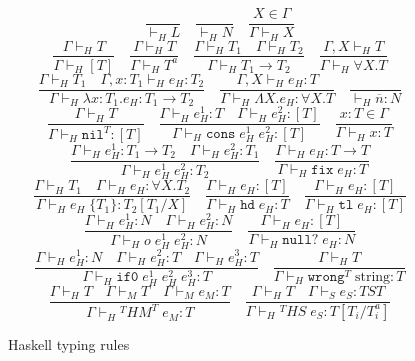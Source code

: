 \begin{figure}[p]
\[
\frac{}{\vdash_{H}L}
\quad
\frac{}{\vdash_{H}N}
\quad
\frac{X\in\Gamma}{\Gamma\vdash_{H}X}
\]
\[
\frac{\Gamma\vdash_{H}T}{\Gamma\vdash_{H}[T]}
\quad
\frac{\Gamma\vdash_{H}T}{\Gamma\vdash_{H}T^{a}}
\quad
\frac{\Gamma\vdash_{H}T_{1}\quad\Gamma\vdash_{H}T_{2}}{\Gamma\vdash_{H}T_{1}\rightarrow T_{2}}
\quad
\frac{\Gamma ,X\vdash_{H}T}{\Gamma\vdash_{H}\forall X.T}
\]
\bigskip
\[
\frac{\Gamma\vdash_{H}T_{1}\quad\Gamma,x:T_{1}\vdash_{H}e_{H}:T_{2}}{\Gamma\vdash_{H}\lambda x:T_{1}.e_{H}:T_{1}\rightarrow T_{2}}
\quad
\frac{\Gamma,X\vdash_{H}e_{H}:T}{\Gamma\vdash_{H}\Lambda X.e_{H}:\forall X.T}
\quad
\frac{}{\vdash_{H}\overline{n}:N}
\]
\[
\frac{\Gamma\vdash_{H}T}{\Gamma\vdash_{H}\mathtt{nil}^{T}:[T]}
\quad
\frac{\Gamma\vdash_{H}e_{H}^{1}:T\quad\Gamma\vdash_{H}e_{H}^{2}:[T]}{\Gamma\vdash_{H}\mathtt{cons}\;e_{H}^{1}\;e_{H}^{2}:[T]}
\quad
\frac{x:T\in\Gamma}{\Gamma\vdash_{H}x:T}
\]
\[
\frac{\Gamma\vdash_{H}e_{H}^{1}:T_{1}\rightarrow T_{2}\quad\Gamma\vdash_{H}e_{H}^{2}:T_{1}}{\Gamma\vdash_{H}e_{H}^{1}\;e_{H}^{2}:T_{2}}
\quad
\frac{\Gamma\vdash_{H}e_{H}:T\rightarrow T}{\Gamma\vdash_{H}\mathtt{fix}\;e_{H}:T}
\]
\[
\frac{\Gamma\vdash_{H}T_{1}\quad\Gamma\vdash_{H}e_{H}:\forall X.T_{2}}{\Gamma\vdash_{H}e_{H}\;\lbrace T_{1}\rbrace:T_{2}[T_{1}/X]}
\quad
\frac{\Gamma\vdash_{H}e_{H}:[T]}{\Gamma\vdash_{H}\mathtt{hd}\;e_{H}:T}
\quad
\frac{\Gamma\vdash_{H}e_{H}:[T]}{\Gamma\vdash_{H}\mathtt{tl}\;e_{H}:[T]}
\]
\[
\frac{\Gamma\vdash_{H}e_{H}^{1}:N\quad\Gamma\vdash_{H}e_{H}^{2}:N}{\Gamma\vdash_{H}o\;e_{H}^{1}\;e_{H}^{2}:N}
\quad
\frac{\Gamma\vdash_{H}e_{H}:[T]}{\Gamma\vdash_{H}\mathtt{null?}\;e_{H}:N}
\]
\[
\frac{\Gamma\vdash_{H}e_{H}^{1}:N\quad\Gamma\vdash_{H}e_{H}^{2}:T\quad\Gamma\vdash_{H}e_{H}^{3}:T}{\Gamma\vdash_{H}\mathtt{if0}\;e_{H}^{1}\;e_{H}^{2}\;e_{H}^{3}:T}
\quad
\frac{\Gamma\vdash_{H}T}{\Gamma\vdash_{H}\mathtt{wrong}^{T}\;\mathrm{string}:T}
\]
\[
\frac{\Gamma\vdash_{H}T\quad\Gamma\vdash_{M}T\quad\Gamma\vdash_{M}e_{M}:T}{\Gamma\vdash_{H}{^{T}H}M^{T}\;e_{M}:T}
\quad
\frac{\Gamma\vdash_{H}T\quad\Gamma\vdash_{S}e_{S}:TST}{\Gamma\vdash_{H}{^{T}H}S\;e_{S}:T[T_{i}/T^{a}_{i}]}
\]
\caption{Haskell typing rules}
\label{htr}
\end{figure}